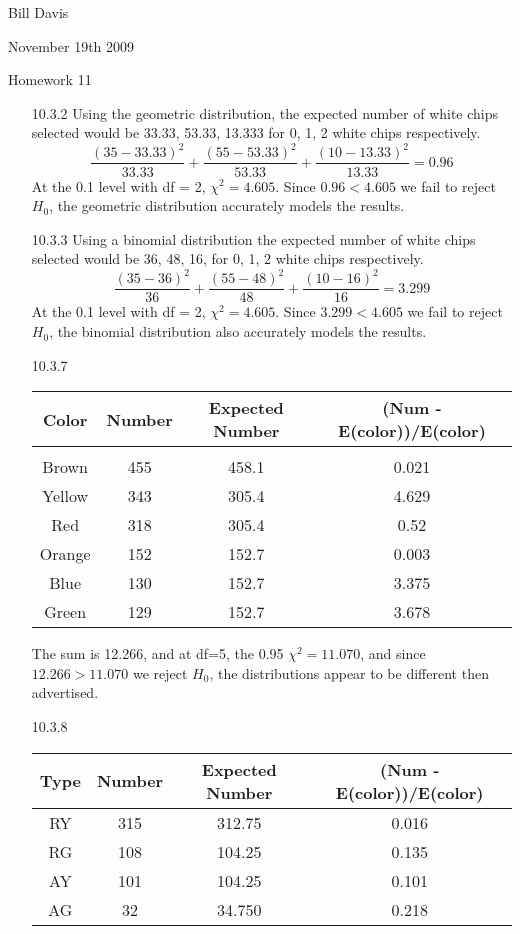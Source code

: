 \documentclass[11pt,fleqn]{article}
\begin{document}
\newcommand{\mbf}[1]{\mbox{{\bfseries #1}}}
\newcommand{\N}{\mbf{N}}
\renewcommand{\O}{\mbf{O}}
\newcommand{\tabfrac}[2]{%
	\setlength{\fboxrule}{0pt}%
	\fbox{$\frac{#1}{#2}$}%
}

\noindent Bill Davis 

\noindent November 19th 2009 

\noindent Homework 11

\begin{enumerate}

\item[10.3.2]
Using the geometric distribution, the expected number of white chips selected
would be 33.33, 53.33, 13.333 for 0, 1, 2 white chips respectively. 
\[
\frac{(35-33.33)^2}{33.33} + \frac{(55-53.33)^2}{53.33} +
\frac{(10-13.33)^2}{13.33} = 0.96
\]
At the 0.1 level with df = 2, $\chi^2 = 4.605$. Since $0.96<4.605$ we fail to
reject $H_0$, the geometric distribution accurately models the results. 

\item[10.3.3]
Using a binomial distribution the expected number of white chips selected
would be 36, 48, 16, for 0, 1, 2 white chips respectively. 
\[
\frac{(35-36)^2}{36} + \frac{(55-48)^2}{48} +
\frac{(10-16)^2}{16} = 3.299
\]
At the 0.1 level with df = 2, $\chi^2 = 4.605$. Since $3.299<4.605$ we fail to
reject $H_0$, the binomial distribution also accurately models the results.

\item[10.3.7]
\begin{tabular}{c c c|c}
Color & Number & Expected Number & (Num - E(color))/E(color) \\
\hline \\
Brown & 455 & 458.1 & 0.021 \\
Yellow & 343 & 305.4 & 4.629 \\
Red & 318 & 305.4 & 0.52 \\ 
Orange & 152 & 152.7 & 0.003\\ 
Blue & 130 & 152.7 & 3.375\\ 
Green & 129 & 152.7 & 3.678\\
\end{tabular}

The sum is 12.266, and at df=5, the 0.95 $\chi^2=11.070$, and since $12.266>
11.070$ we reject $H_0$, the distributions appear to be different then
advertised. 
\item[10.3.8]
\begin{tabular}{c c c|c}
Type & Number & Expected Number & (Num - E(color))/E(color) \\
\hline
RY & 315 & 312.75 & 0.016 \\
RG & 108 & 104.25 & 0.135 \\
AY & 101 & 104.25 & 0.101 \\
AG & 32  & 34.750 & 0.218 \\
\hline 
\end{tabular}


\end{enumerate}
\end{document}
